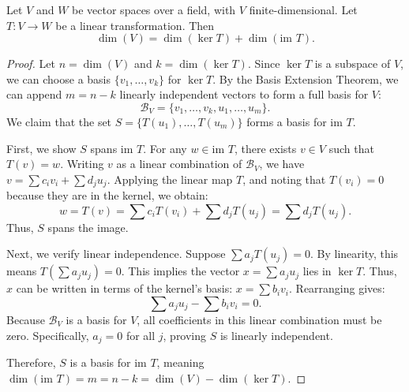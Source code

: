 \documentclass[11pt]{scrartcl}
\begin{document}
\begin{theorem}
    Let $V$ and $W$ be vector spaces over a field, with $V$ finite-dimensional. Let $T \colon V \to W$ be a linear transformation. Then
    \[ \dim(V) = \dim(\ker T) + \dim(\text{im } T). \]
\end{theorem}
\begin{proof}
    Let $n = \dim(V)$ and $k = \dim(\ker T)$. Since $\ker T$ is a subspace of $V$, we can choose a basis $\{v_1, \dots, v_k\}$ for $\ker T$. By the Basis Extension Theorem, we can append $m = n - k$ linearly independent vectors to form a full basis for $V$:
    \[ \mathcal{B}_V = \{v_1, \dots, v_k, u_1, \dots, u_m\}. \]
    We claim that the set $S = \{T(u_1), \dots, T(u_m)\}$ forms a basis for $\text{im } T$. 
    
    First, we show $S$ spans $\text{im } T$. For any $w \in \text{im } T$, there exists $v \in V$ such that $T(v) = w$. Writing $v$ as a linear combination of $\mathcal{B}_V$, we have $v = \sum c_i v_i + \sum d_j u_j$. Applying the linear map $T$, and noting that $T(v_i) = 0$ because they are in the kernel, we obtain:
    \[ w = T(v) = \sum c_i T(v_i) + \sum d_j T(u_j) = \sum d_j T(u_j). \]
    Thus, $S$ spans the image.
    
    Next, we verify linear independence. Suppose $\sum a_j T(u_j) = 0$. By linearity, this means $T(\sum a_j u_j) = 0$. This implies the vector $x = \sum a_j u_j$ lies in $\ker T$. Thus, $x$ can be written in terms of the kernel's basis: $x = \sum b_i v_i$. Rearranging gives:
    \[ \sum a_j u_j - \sum b_i v_i = 0. \]
    Because $\mathcal{B}_V$ is a basis for $V$, all coefficients in this linear combination must be zero. Specifically, $a_j = 0$ for all $j$, proving $S$ is linearly independent.
    
    Therefore, $S$ is a basis for $\text{im } T$, meaning $\dim(\text{im } T) = m = n - k = \dim(V) - \dim(\ker T)$.
\end{proof}
\end{document}
